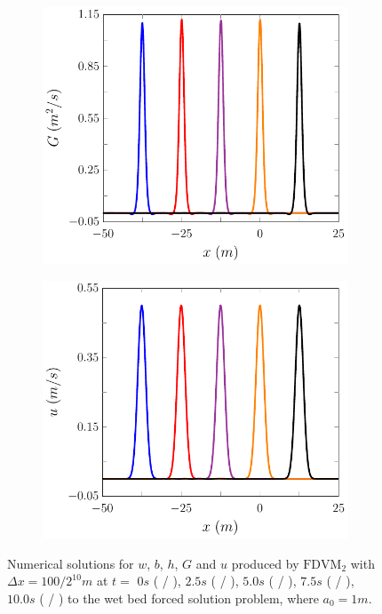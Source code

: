 \begin{figure}
\begin{subfigure}{0.5\textwidth}
		\vspace{0.5cm}
	\end{subfigure}
	\begin{subfigure}{0.5\textwidth}
		\includegraphics[width=\textwidth]{./chp5/figures/Forced/Wet/FDVMG.pdf}
	\end{subfigure}%
	\begin{subfigure}{0.5\textwidth}
		\includegraphics[width=\textwidth]{./chp5/figures/Forced/Wet/FDVMu.pdf}
	\end{subfigure}
	\caption{Numerical solutions for $w$, $b$, $h$, $G$ and $u$ produced by $\text{FDVM}_2$ with $\Delta x = 100 / 2^{10}m$ at $t=$ $0s$ ({\color{blue} \solidrule} /  ), $2.5s$ ({\color{red} \solidrule}/ ), $5.0s$ ({\color{violet!80!white} \solidrule} / ), $7.5s$ ({\color{orange} \solidrule}/ ), $10.0s$ ({\color{black} \solidrule} / ) to the wet bed forced solution problem, where $a_0 = 1m$.}
	\label{fig:ForcedWetFDVMP2PExAll}
\end{figure}

